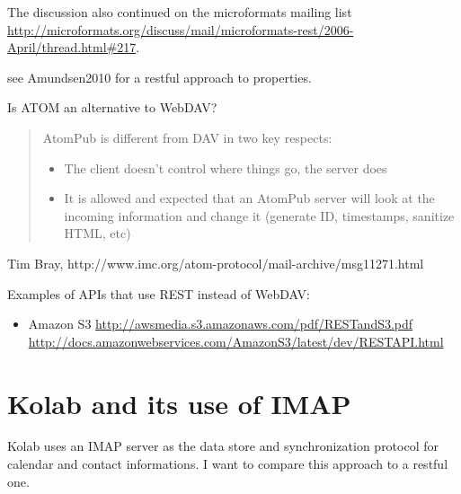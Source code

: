 \documentclass[12pt,a4paper]{scrartcl}		%
\begin{document}
The discussion also continued on the microformats mailing list
\url{http://microformats.org/discuss/mail/microformats-rest/2006-April/thread.html#217}.

see Amundsen2010 for a restful approach to properties.

Is ATOM an alternative to WebDAV?

\begin{quote}
  AtomPub is different from DAV in two key respects:
  \begin{itemize}
  \item The client doesn't control where things go, the server does
  \item It is allowed and expected that an AtomPub server will look at the incoming information and change it (generate ID, timestamps, sanitize HTML, etc)
  \end{itemize}
\end{quote}
Tim Bray, http://www.imc.org/atom-protocol/mail-archive/msg11271.html



Examples of APIs that use REST instead of WebDAV:
\begin{itemize}
\item Amazon S3 \url{http://awsmedia.s3.amazonaws.com/pdf/RESTandS3.pdf} \url{http://docs.amazonwebservices.com/AmazonS3/latest/dev/RESTAPI.html}

\end{itemize}


\section{Kolab and its use of IMAP}
Kolab uses an IMAP server as the data store and
synchronization protocol for calendar and contact informations. I want to
compare this approach to a restful one.
\end{document}

